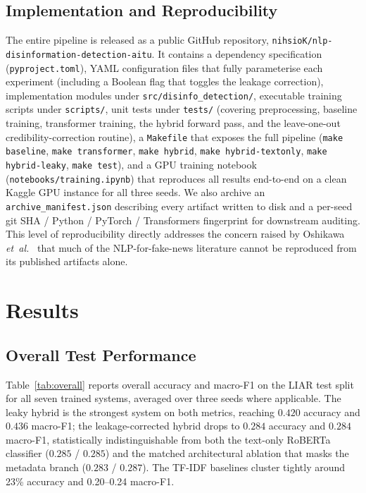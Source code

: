 \documentclass[journal]{IEEEtran}
\begin{document}
\subsection{Implementation and Reproducibility}
The entire pipeline is released as a public GitHub repository, \texttt{nihsioK/nlp-disinformation-detection-aitu}. It contains a dependency specification (\texttt{pyproject.toml}), YAML configuration files that fully parameterise each experiment (including a Boolean flag that toggles the leakage correction), implementation modules under \texttt{src/disinfo\_detection/}, executable training scripts under \texttt{scripts/}, unit tests under \texttt{tests/} (covering preprocessing, baseline training, transformer training, the hybrid forward pass, and the leave-one-out credibility-correction routine), a \texttt{Makefile} that exposes the full pipeline (\texttt{make baseline}, \texttt{make transformer}, \texttt{make hybrid}, \texttt{make hybrid-textonly}, \texttt{make hybrid-leaky}, \texttt{make test}), and a GPU training notebook (\texttt{notebooks/training.ipynb}) that reproduces all results end-to-end on a clean Kaggle GPU instance for all three seeds. We also archive an \texttt{archive\_manifest.json} describing every artifact written to disk and a per-seed git SHA / Python / PyTorch / Transformers fingerprint for downstream auditing. This level of reproducibility directly addresses the concern raised by Oshikawa \emph{et~al.}~\cite{oshikawa2020} that much of the NLP-for-fake-news literature cannot be reproduced from its published artifacts alone.

\section{Results}
\label{sec:results}

\subsection{Overall Test Performance}
Table~\ref{tab:overall} reports overall accuracy and macro-F1 on the LIAR test split for all seven trained systems, averaged over three seeds where applicable. The leaky hybrid is the strongest system on both metrics, reaching $0.420$ accuracy and $0.436$ macro-F1; the leakage-corrected hybrid drops to $0.284$ accuracy and $0.284$ macro-F1, statistically indistinguishable from both the text-only RoBERTa classifier ($0.285$ / $0.285$) and the matched architectural ablation that masks the metadata branch ($0.283$ / $0.287$). The TF-IDF baselines cluster tightly around 23\% accuracy and 0.20--0.24 macro-F1.
\end{document}
